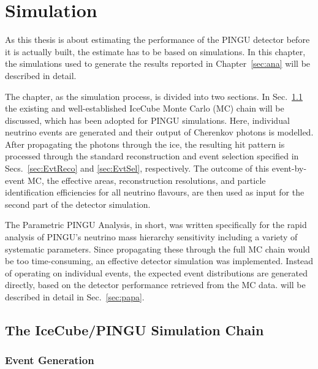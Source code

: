 \chapter{Simulation}
\label{sec:sim}

As this thesis is about estimating the performance of the PINGU detector before
it is actually built, the estimate has to be based on simulations. In this
chapter, the simulations used to generate the results reported in
Chapter~\ref{sec:ana} will be described in detail.

The chapter, as the simulation process, is divided into two sections.
In Sec.~\ref{sec:sim_MCchain} the existing and well-established IceCube Monte
Carlo (MC) chain will be discussed, which has been adopted for PINGU
simulations.
Here, individual neutrino events are generated and their output of Cherenkov
photons is modelled. After propagating the photons through the ice, the
resulting hit pattern is processed through the standard reconstruction and event
selection specified in Secs.~\ref{sec:EvtReco} and \ref{sec:EvtSel},
respectively. The outcome of this event-by-event MC, \ie the effective
areas, reconstruction resolutions, and particle identification efficiencies for
all neutrino flavours, are then used as input for the second part of the
detector simulation.

The Parametric PINGU Analysis, \papa in short, was written specifically for the
rapid analysis of PINGU's neutrino mass hierarchy sensitivity including a
variety of systematic parameters. Since propagating these through the full
MC chain would be too time-consuming, an effective detector
simulation was implemented. Instead of operating on individual events,
the expected event distributions are generated directly, based on the detector
performance retrieved from the MC data. \papa will be described in
detail in Sec.~\ref{sec:papa}.

\section{The IceCube/PINGU Simulation Chain}
\label{sec:sim_MCchain}

\subsection{Event Generation}
\label{sec:MC_genie}

